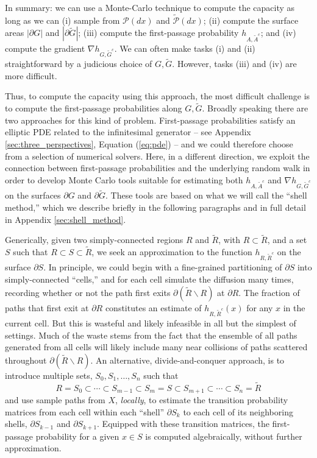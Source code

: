 \documentclass[12pt, nofootinbib,english, amsmath, amssymb, aps, priprint, graphicx,floatfix,draft]{revtex4-1}
\theoremstyle{plain}
\theoremstyle{definition}
\theoremstyle{plain}
\newcommand{\PMeasure}{\mathscr{P}(dx)}
\newcommand{\tPMeasure}{\tilde{\mathscr P}(dx)}
\begin{document}
In summary: we can use a Monte-Carlo technique to compute the capacity as long as we can (i) sample from $\PMeasure$ and $\tPMeasure$; (ii) compute the surface areas $|\partial G|$ and
$|\partial\tilde{G}|$; (iii)
compute the first-passage probability $h_{A, \tilde{A}^c}$; and (iv) compute the gradient
$\nabla h_{G, \tilde{G}^c}$.  
We can often make tasks (i) and (ii) straightforward by a judicious choice of $G,\tilde G$.  However, tasks (iii) and (iv) are more difficult.  

Thus, to compute the capacity using this approach, the most difficult challenge is to compute the first-passage probabilities along $G,\tilde G$.  Broadly speaking there are two approaches for this kind of problem.  First-passage probabilities satisfy an elliptic PDE related to the infinitesimal generator -- see Appendix \ref{sec:three_perspectives}, Equation (\ref{eq:pde}) -- and we could therefore choose from a selection of numerical solvers. Here, in a different direction, we exploit the connection between first-passage probabilities and the underlying random walk in order to develop Monte Carlo tools suitable for estimating both $h_{A, \tilde{A}^c}$ and $\nabla h_{G, \tilde{G}^c}$ on the surfaces
$\partial G$ and $\partial\tilde{G}$. These tools are based on
what we will call the ``shell method,'' which we describe briefly in the following paragraphs and in full detail in Appendix \ref{sec:shell_method}.

Generically, given two simply-connected regions $R$ and $\tilde{R}$, with $R\subset \tilde{R}$, and a set $S$ such that
$R\subset S  \subset\tilde{R}$, we seek an approximation to
the function $h_{R,\tilde{R}^c}$ on the surface $\partial S$. In principle, we could begin with a fine-grained partitioning of $\partial S$ into simply-connected ``cells,'' and for each cell simulate the diffusion many times, recording whether or not the path first exits $\partial (\tilde{R}\backslash R)$ at $\partial R$. The fraction of paths that first exit at $\partial R$ constitutes an estimate of
$h_{R,\tilde{R}^c}(x)$ for any $x$ in the current cell. But this is wasteful and likely infeasible in all but the simplest of settings. Much of the waste stems from the fact that the ensemble of all paths generated from all cells will likely include many near collisions of paths scattered throughout $\partial (\tilde{R}\backslash R)$. An alternative, divide-and-conquer  approach, is to introduce multiple sets, $S_0,S_1,\ldots,S_n$ such that
\begin{equation*}
R=S_0 \subset \cdots \subset S_{m-1}\subset S_m = S \subset S_{m+1} \subset \cdots \subset S_n = \tilde{R}
\end{equation*}
and use sample paths from $X$, {\em locally}, to estimate the transition probability matrices from each cell within each ``shell'' $\partial S_k$ to each cell of its neighboring shells, $\partial S_{k-1}$ and $\partial S_{k+1}$. Equipped with these transition matrices, the first-passage probability for a given $x\in S$ is computed algebraically, without further approximation.
\end{document}
